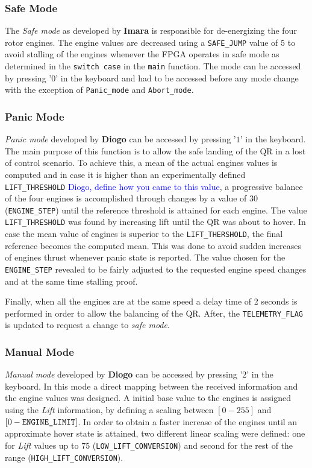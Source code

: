 \documentclass{article}
\newcommand\todo[1]{\textcolor{blue}{#1}} %
\begin{document}
\subsubsection{Safe Mode}
\label{sec:safemode}
The \textit{Safe mode} as developed by \textbf{Imara} is responsible for de-energizing the four rotor engines. The engine values are decreased using a \texttt{SAFE\_JUMP} value of 5 to avoid stalling of the engines whenever the FPGA operates in safe mode as determined in the \texttt{switch case} in the \texttt{main} function. The mode can be accessed by pressing '$0$' in the keyboard and had to be accessed before any mode change with the exception of \texttt{Panic\_mode} and \texttt{Abort\_mode}.

\subsubsection{Panic Mode}
\textit{Panic mode} developed by \textbf{Diogo} can be accessed by pressing '$1$' in the keyboard. The main purpose of this function is to allow the safe landing of the QR in a lost of control scenario. To achieve this, a mean of the actual engines values is computed and in case it is higher than an experimentally defined \texttt{LIFT\_THRESHOLD} \todo{Diogo, define how you came to this value}, a progressive balance of the four engines is accomplished through changes by a value of $30$ (\texttt{ENGINE\_STEP}) until the reference threshold is attained for each engine. The value \texttt{LIFT\_THRESHOLD} was found by increasing lift until the QR was about to hover.  In case the mean value of engines is superior to the \texttt{LIFT\_THERSHOLD}, the final reference becomes the computed mean. This was done to avoid sudden increases of engines thrust whenever panic state is reported. The value chosen for the \texttt{ENGINE\_STEP} revealed to be fairly adjusted to the requested engine speed changes and at the same time stalling proof.

Finally, when all the engines are at the same speed a delay time of 2 seconds is performed in order to allow the balancing of the QR. After, the \texttt{TELEMETRY\_FLAG} is updated to request a change to \textit{safe mode}.

\subsubsection{Manual Mode}
\textit{Manual mode} developed by \textbf{Diogo} can be accessed by pressing '$2$' in the keyboard. In this mode a direct mapping between the received information and the engine values was designed. A initial base value to the engines is assigned using the \textit{Lift} information, by defining a scaling between $[0-255]$ and $[0-\text{\texttt{ENGINE\_LIMIT}}]$. In order to obtain a faster increase of the engines until an approximate hover state is attained, two different linear scaling were defined: one for \textit{Lift} values up to $75$ (\texttt{LOW\_LIFT\_CONVERSION}) and second for the rest of the range (\texttt{HIGH\_LIFT\_CONVERSION}).
\end{document}
